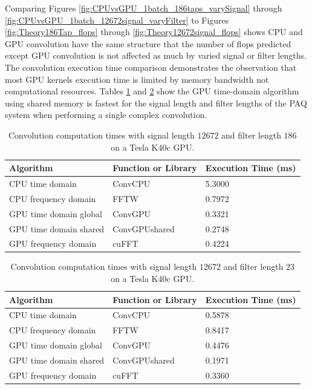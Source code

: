 Comparing Figures \ref{fig:CPUvsGPU_1batch_186taps_varySignal} through \ref{fig:CPUvsGPU_1batch_12672signal_varyFilter}
to Figures \ref{fig:Theory186Tap_flops} through
\ref{fig:Theory12672signal_flops} 
shows
CPU and GPU convolution have the same structure that the number of flops predicted except GPU convolution is not affected as much by varied signal or filter lengths.
The convolution execution time comparison demonstrates the observation that most GPU kernels execution time is limited by memory bandwidth not computational resources.
Tables \ref{tab:CPUvsGPUtable_12672_186} and \ref{tab:CPUvsGPUtable_12672_21} show the GPU time-domain algorithm using shared memory is fastest for the signal length and filter lengths of the PAQ system when performing a single complex convolution.
\begin{table}
\caption{Convolution computation times with signal length $12672$ and filter length $186$ on a Tesla K40c GPU.}
\begin{center}
\begin{tabular}{lll}
	\toprule
	Algorithm 				& Function or Library		& Execution Time (ms) \\ \midrule
	CPU time domain 		& ConvCPU 					& 5.3000		\\
	CPU frequency domain 	& FFTW 						& 0.7972		\\
	GPU time domain global 	& ConvGPU 					& 0.3321		\\
	GPU time domain shared 	& ConvGPUshared 			& 0.2748		\\
	GPU frequency domain 	& cuFFT						& 0.4224		\\ 
	\bottomrule
\end{tabular}
\end{center}
\label{tab:CPUvsGPUtable_12672_186}
\end{table}
\begin{table}
\caption{Convolution computation times with signal length $12672$ and filter length $23$ on a Tesla K40c GPU.}
\begin{center}
\begin{tabular}{lll}
	\toprule
	Algorithm 				& Function or Library		& Execution Time (ms) \\ \midrule
	CPU time domain 		& ConvCPU 					& 0.5878		\\
	CPU frequency domain 	& FFTW 						& 0.8417		\\
	GPU time domain global 	& ConvGPU 					& 0.4476		\\
	GPU time domain shared 	& ConvGPUshared 			& 0.1971		\\
	GPU frequency domain 	& cuFFT						& 0.3360		\\ 
	\bottomrule
\end{tabular}
\end{center}
\label{tab:CPUvsGPUtable_12672_21}
\end{table}

